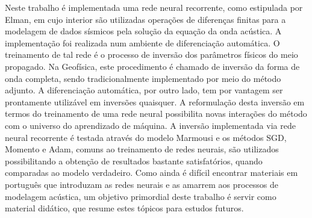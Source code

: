  

Neste trabalho é implementada uma rede neural recorrente, como estipulada por Elman, em cujo interior são utilizadas operações de diferenças finitas para a modelagem de dados sísmicos pela solução da equação da onda acústica. A implementação foi realizada num ambiente de diferenciação automática. O treinamento de tal rede é o processo de inversão dos parâmetros físicos do meio propagado. Na Geofísica, este procedimento é chamado de inversão da forma de onda completa, sendo tradicionalmente implementado por meio do método adjunto. A diferenciação automática, por outro lado, tem por vantagem ser prontamente utilizável em inversões quaisquer. A reformulação desta inversão em termos do treinamento de uma rede neural possibilita novas interações do método com o universo do aprendizado de máquina. A inversão implementada via rede neural recorrente é testada através do modelo Marmousi e os métodos SGD, Momento e Adam, comuns ao treinamento de redes neurais, são utilizados possibilitando a obtenção de resultados bastante satisfatórios, quando comparadas ao modelo verdadeiro. Como ainda é difícil encontrar materiais em português que introduzam as redes neurais e as amarrem aos processos de modelagem acústica, um objetivo primordial deste trabalho é servir como material didático, que resume estes tópicos para estudos futuros.
